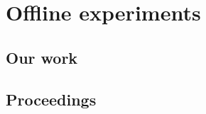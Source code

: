 \chapter{Offline experiments}  \label{chap:offline_experiments}

\section{Our work}

\section{Proceedings}